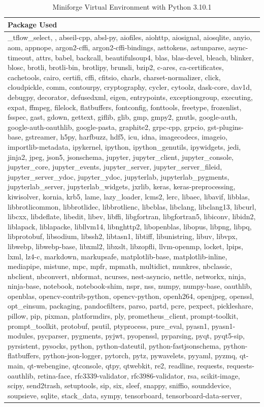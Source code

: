 \documentclass[conference]{IEEEtran}
\begin{document}
            \begin{table}[]
                \caption{Miniforge Virtual Environment with Python 3.10.1}
                \centering
                \begin{tabular}{|p{7.4cm}|}
                    \hline
                    Package Used\\
                    \hline
                    \_tflow\_select, , abseil-cpp, absl-py, aiofiles, aiohttp, aiosignal, aiosqlite, anyio, aom, appnope, argon2-cffi, argon2-cffi-bindings, asttokens, astunparse, async-timeout, attrs, babel, backcall, beautifulsoup4, blas, blas-devel, bleach, blinker, blosc, brotli, brotli-bin, brotlipy, brunsli, bzip2, c-ares, ca-certificates, cachetools, cairo, certifi, cffi, cfitsio, charls, charset-normalizer, click, cloudpickle, comm, contourpy, cryptography, cycler, cytoolz, dask-core, dav1d, debugpy, decorator, defusedxml, eigen, entrypoints, exceptiongroup, executing, expat, ffmpeg, filelock, flatbuffers, fontconfig, fonttools, freetype, frozenlist, fsspec, gast, gdown, gettext, giflib, glib, gmp, gmpy2, gnutls, google-auth, google-auth-oauthlib, google-pasta, graphite2, grpc-cpp, grpcio, gst-plugins-base, gstreamer, h5py, harfbuzz, hdf5, icu, idna, imagecodecs, imageio, importlib-metadata, ipykernel, ipython, ipython\_genutils, ipywidgets, jedi, jinja2, jpeg, json5, jsonschema, jupyter, jupyter\_client, jupyter\_console, jupyter\_core, jupyter\_events, jupyter\_server, jupyter\_server\_fileid, jupyter\_server\_ydoc, jupyter\_ydoc, jupyterlab, jupyterlab\_pygments, jupyterlab\_server, jupyterlab\_widgets, jxrlib, keras, keras-preprocessing, kiwisolver, kornia, krb5, lame, lazy\_loader, lcms2, lerc, libaec, libavif, libblas, libbrotlicommon, libbrotlidec, libbrotlienc, libcblas, libclang, libclang13, libcurl, libcxx, libdeflate, libedit, libev, libffi, libgfortran, libgfortran5, libiconv, libidn2, liblapack, liblapacke, libllvm14, libnghttp2, libopenblas, libopus, libpng, libpq, libprotobuf, libsodium, libssh2, libtasn1, libtiff, libunistring, libuv, libvpx, libwebp, libwebp-base, libxml2, libxslt, libzopfli, llvm-openmp, locket, lpips, lxml, lz4-c, markdown, markupsafe, matplotlib-base, matplotlib-inline, mediapipe, mistune, mpc, mpfr, mpmath, multidict, munkres, nbclassic, nbclient, nbconvert, nbformat, ncurses, nest-asyncio, nettle, networkx, ninja, ninja-base, notebook, notebook-shim, nspr, nss, numpy, numpy-base, oauthlib, openblas, opencv-contrib-python, opencv-python, openh264, openjpeg, openssl, opt\_einsum, packaging, pandocfilters, parso, partd, pcre, pexpect, pickleshare, pillow, pip, pixman, platformdirs, ply, prometheus\_client, prompt-toolkit, prompt\_toolkit, protobuf, psutil, ptyprocess, pure\_eval, pyasn1, pyasn1-modules, pycparser, pygments, pyjwt, pyopenssl, pyparsing, pyqt, pyqt5-sip, pyrsistent, pysocks, python, python-dateutil, python-fastjsonschema, python-flatbuffers, python-json-logger, pytorch, pytz, pywavelets, pyyaml, pyzmq, qt-main, qt-webengine, qtconsole, qtpy, qtwebkit, re2, readline, requests, requests-oauthlib, retina-face, rfc3339-validator, rfc3986-validator, rsa, scikit-image, scipy, send2trash, setuptools, sip, six, sleef, snappy, sniffio, sounddevice, soupsieve, sqlite, stack\_data, sympy, tensorboard, tensorboard-data-server, 
\end{tabular}
\end{table}
\end{document}
